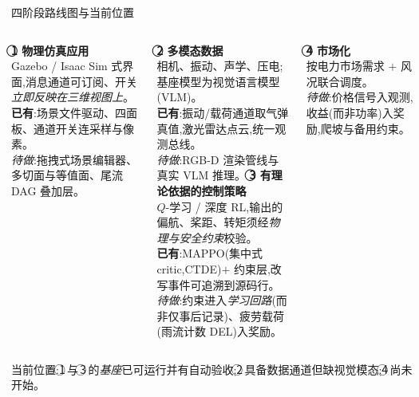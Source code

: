 \documentclass[aspectratio=169,11pt,UTF8]{ctexbeamer}
\newcommand{\emphg}[1]{\textcolor{mygreen}{\textbf{#1}}}
\begin{document}
\begin{frame}{四阶段路线图与当前位置}
\small
\begin{columns}[T]
\textbf{\textcircled{1} 物理仿真应用}\\
{\footnotesize
Gazebo / Isaac Sim 式界面,消息通道可订阅、开关\emph{立即反映在三维视图上}。\\
\emphg{已有}:场景文件驱动、四面板、通道开关连采样与像素。\\
\emph{待做}:拖拽式场景编辑器、多切面与等值面、尾流 DAG 叠加层。}
\vspace{1.5mm}

\textbf{\textcircled{2} 多模态数据}\\
{\footnotesize
相机、振动、声学、压电;基座模型为视觉语言模型(VLM)。\\
\emphg{已有}:振动/载荷通道取气弹真值,激光雷达点云,统一观测总线。\\
\emph{待做}:RGB-D 渲染管线与真实 VLM 推理。}
\textbf{\textcircled{3} 有理论依据的控制策略}\\
{\footnotesize
$Q$-学习 / 深度 RL,输出的偏航、桨距、转矩须经\emph{物理与安全约束}校验。\\
\emphg{已有}:MAPPO(集中式 critic,CTDE)$+$ 约束层,改写事件可追溯到源码行。\\
\emph{待做}:约束进入\emph{学习回路}(而非仅事后记录)、疲劳载荷(雨流计数 DEL)入奖励。}
\vspace{1.5mm}

\textbf{\textcircled{4} 市场化}\\
{\footnotesize
按电力市场需求 $+$ 风况联合调度。\\
\emph{待做}:价格信号入观测,收益(而非功率)入奖励,爬坡与备用约束。}
\end{columns}
\vspace{1.5mm}
\centering\footnotesize\color{mygray}
当前位置:\textcircled{1}\,与\,\textcircled{3}\,的\emph{基座}已可运行并有自动验收;\textcircled{2}\,具备数据通道但缺视觉模态;\textcircled{4}\,尚未开始。
\end{frame}

\end{document}

